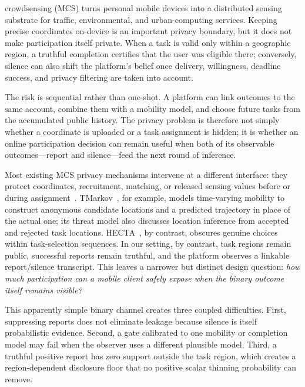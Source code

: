 \documentclass[10pt,journal,compsoc]{IEEEtran}
\begin{document}
\maketitle
\IEEEdisplaynontitleabstractindextext
\IEEEpeerreviewmaketitle

 crowdsensing (MCS) turns personal mobile devices into a distributed sensing substrate for traffic, environmental, and urban-computing services. Keeping precise coordinates on-device is an important privacy boundary, but it does not make participation itself private. When a task is valid only within a geographic region, a truthful completion certifies that the user was eligible there; conversely, silence can also shift the platform's belief once delivery, willingness, deadline success, and privacy filtering are taken into account.

The risk is sequential rather than one-shot. A platform can link outcomes to the same account, combine them with a mobility model, and choose future tasks from the accumulated public history. The privacy problem is therefore not simply whether a coordinate is uploaded or a task assignment is hidden; it is whether an online participation decision can remain useful when both of its observable outcomes---report and silence---feed the next round of inference.

Most existing MCS privacy mechanisms intervene at a different interface: they protect coordinates, recruitment, matching, or released sensing values before or during assignment~\cite{itam2021,taskloc2022,pmta2024,ppur2024,lrppsta2025,mtadprh2025}. TMarkov~\cite{tmarkov}, for example, models time-varying mobility to construct anonymous candidate locations and a predicted trajectory in place of the actual one; its threat model also discusses location inference from accepted and rejected task locations. HECTA~\cite{inference2026}, by contrast, obscures genuine choices within task-selection sequences. In our setting, by contrast, task regions remain public, successful reports remain truthful, and the platform observes a linkable report/silence transcript. This leaves a narrower but distinct design question: \emph{how much participation can a mobile client safely expose when the binary outcome itself remains visible?}

This apparently simple binary channel creates three coupled difficulties. First, suppressing reports does not eliminate leakage because silence is itself probabilistic evidence. Second, a gate calibrated to one mobility or completion model may fail when the observer uses a different plausible model. Third, a truthful positive report has zero support outside the task region, which creates a region-dependent disclosure floor that no positive scalar thinning probability can remove.
\end{document}
